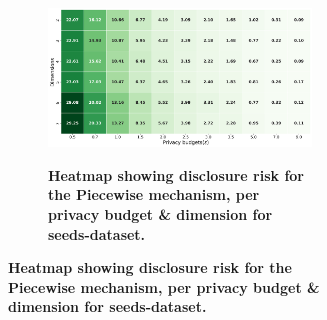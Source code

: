\begin{figure}[H]
\begin{subfigure}[b]{0.9\textwidth}
        \begin{subfigure}[c]{1\textwidth}
            \caption{\textbf{Heatmap showing disclosure risk for the Piecewise mechanism, per privacy budget \& dimension for seeds-dataset.}}
            \includegraphics[width=1\textwidth]{Results/kd-laplace/piecewise/seeds-dataset/distance.png}
            \label{fig:privacy_dist_seeds-dataset_adversial_advantage_piecewise}
        \end{subfigure}
    \end{subfigure}
    \hfill %
    \begin{subfigure}[b]{0.075\textwidth}

\end{subfigure}
\end{figure}
